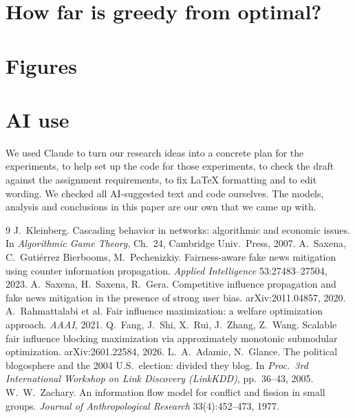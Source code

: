 \documentclass[11pt]{article}
\begin{document}
\section{How far is greedy from optimal?}\label{sec:brute}


\clearpage
\appendix
\section{Figures}\label{app:figures}




\section*{AI use}
We used Claude to turn our research ideas into a concrete plan for the experiments, to help set up the code for those experiments, to check the draft against the assignment requirements, to fix LaTeX formatting and to edit wording.
We checked all AI-suggested text and code ourselves. The models, analysis and conclusions in this paper are our own that we came up with.

\begin{thebibliography}{9}
 J.~Kleinberg. Cascading behavior in networks: algorithmic and economic issues. In \emph{Algorithmic Game Theory}, Ch.~24, Cambridge Univ.\ Press, 2007.
 A.~Saxena, C.~Guti\'errez Bierbooms, M.~Pechenizkiy. Fairness-aware fake news mitigation using counter information propagation. \emph{Applied Intelligence} 53:27483--27504, 2023.
 A.~Saxena, H.~Saxena, R.~Gera. Competitive influence propagation and fake news mitigation in the presence of strong user bias. arXiv:2011.04857, 2020.
 A.~Rahmattalabi et al. Fair influence maximization: a welfare optimization approach. \emph{AAAI}, 2021.
 Q.~Fang, J.~Shi, X.~Rui, J.~Zhang, Z.~Wang. Scalable fair influence blocking maximization via approximately monotonic submodular optimization. arXiv:2601.22584, 2026.
 L.~A.~Adamic, N.~Glance. The political blogosphere and the 2004 U.S.\ election: divided they blog. In \emph{Proc.\ 3rd International Workshop on Link Discovery (LinkKDD)}, pp.~36--43, 2005.
 W.~W.~Zachary. An information flow model for conflict and fission in small groups. \emph{Journal of Anthropological Research} 33(4):452--473, 1977.
\end{thebibliography}
\end{document}
